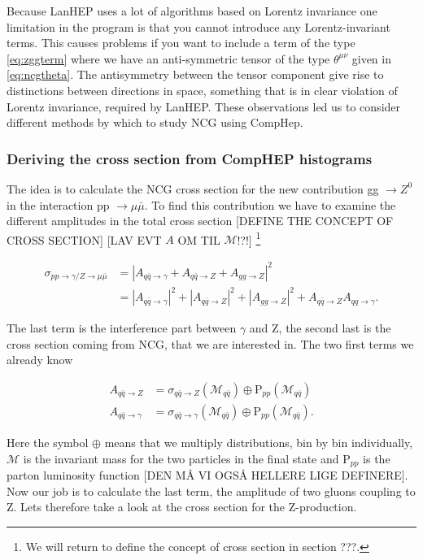 Because LanHEP uses a lot of algorithms based on Lorentz invariance one limitation in the program is that you cannot introduce any Lorentz-invariant terms. This causes problems if you want to include a term of the type \eqref{eq:zggterm} where we have an anti-symmetric tensor of the type $\theta^{\mu\nu}$ given in \eqref{eq:ncgtheta}. The antisymmetry between the tensor component give rise to distinctions between directions in space, something that is in clear violation of Lorentz invariance, required by LanHEP. These observations led us to consider different methods by which to study NCG using CompHep.

\subsubsection{Deriving the cross section from CompHEP histograms}

The idea is to calculate the NCG cross section for the new contribution gg $\rightarrow Z^0$ in the interaction pp $\rightarrow \mu \bar \mu$. To find this contribution we have to examine the different amplitudes in the total cross section [DEFINE THE CONCEPT OF CROSS SECTION] [LAV EVT $A$ OM TIL $\mathcal{M}$!?!] \footnote{We will return to define the concept of cross section in section ???.}

\begin{align}
\sigma_{pp \rightarrow \gamma/ Z \rightarrow \mu \bar \mu} &= |A_{q \bar q \rightarrow \gamma} + A_{q \bar q \rightarrow Z} + A_{gg \rightarrow Z}|^{2} \nonumber \\
&= |A_{q \bar q \rightarrow \gamma}|^{2} + |A_{q \bar q \rightarrow Z}|^ {2} + |A_{gg \rightarrow Z}|^{2} + A_{q \bar q \rightarrow Z }A_{qq \rightarrow \gamma}.
\end{align}

The last term is the interference part between $\gamma$ and Z, the second last is the cross section coming from NCG, that we are interested in. The two first terms we already know

\begin{align}
A_{q \bar q \rightarrow Z} &= \sigma_{q \bar q \rightarrow Z} (\mathcal{M}_{q \bar q}) \oplus \textrm{P}_{pp}(\mathcal{M}_{q \bar q}) \nonumber \\ 
A_{q \bar q \rightarrow \gamma} &= \sigma_{q \bar q \rightarrow  \gamma}( \mathcal{M}_{q \bar q}) \oplus \textrm{P}_{pp}(\mathcal{M}_{q \bar q}).
\end{align}

Here the symbol $\oplus$ means that we multiply distributions, bin by bin individually, $\mathcal{M}$ is the invariant mass for the two particles in the final state and P$_{pp}$ is the parton luminosity function [DEN MÅ VI OGSÅ HELLERE LIGE DEFINERE]. Now our job is to calculate the last term, the amplitude of two gluons coupling to Z. Lets therefore take a look at the cross section for the Z-production.

